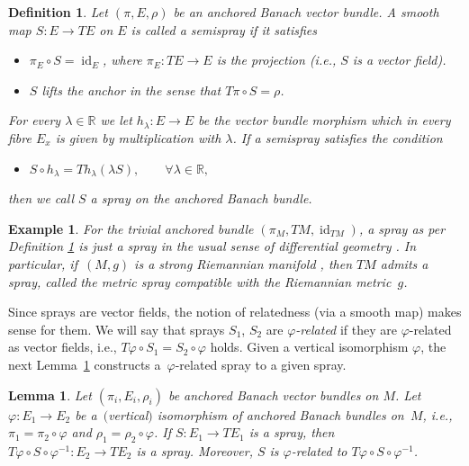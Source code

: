 \documentclass[11pt]{article}
\numberwithin{equation}{section}
\numberwithin{equation}{section}
\newtheorem{Lemma}[Theorem]{Lemma}
\newtheorem{Definition}[Theorem]{Definition}
\newtheorem{Example}[Theorem]{Example}
\newcommand{\R}{\ensuremath{\mathbb{R}}}
\DeclareMathOperator{\id}{id}
\begin{document}
\begin{Definition}\label{defn:spray}
Let $(\pi, E, \rho)$ be an anchored Banach vector bundle.
A smooth map $S\colon E \rightarrow TE$ on $E$ is called a \emph{semispray} if it satisfies
\begin{itemize}\itemsep=0pt
\item[\hypertarget{sprayS1}{(S1)}] $\pi_{E} \circ S = \id_E$, where $\pi_E \colon TE\rightarrow E$ is the projection (i.e., $S$ is a vector field).
\item[\hypertarget{sprayS2}{(S2)}] $S$ \emph{lifts the anchor} in the sense that $T\pi \circ S = \rho$.
\end{itemize}
For every $\lambda \in \R$ we let $h_\lambda \colon E \rightarrow E$ be the vector bundle morphism which in every fibre $E_x$ is given by multiplication with $\lambda$.
If a semispray satisfies the condition
\begin{itemize}\itemsep=0pt
\item[\hypertarget{sprayS3}{(S3)}] $S\circ h_\lambda = Th_\lambda (\lambda S), \qquad \forall \lambda \in \R,$
\end{itemize}
then we call $S$ a \emph{spray} on the anchored Banach bundle.
\end{Definition}

\begin{Example}
For the trivial anchored bundle $(\pi_M, TM,\id_{TM})$, a spray as per Definition \ref{defn:spray} is just a spray in the usual sense of differential geometry \cite[Chapter~IV, Section~3]{La01}.
In particular, if~$(M,g)$ is a strong Riemannian manifold \cite[Section~4]{Sch23}, then $TM$ admits a spray, called the \emph{metric spray} compatible with the Riemannian metric~$g$.
\end{Example}

Since sprays are vector fields, the notion of relatedness (via a smooth map) makes sense for them. We will say that sprays $S_1$, $S_2$ are $\varphi$\emph{-related} if they are $\varphi$-related as vector fields, i.e., $T\varphi \circ S_1 = S_2 \circ \varphi$ holds.
Given a vertical isomorphism $\varphi$, the next Lemma~\ref{lem:anchoredIso} constructs a~$\varphi$-related spray to a given spray.

\begin{Lemma}\label{lem:anchoredIso}
 Let $(\pi_{i},E_{i},\rho_{i})$ be anchored Banach vector bundles on $M$.
 Let $\varphi \colon E_{1} \rightarrow E_{2}$ be a~$($vertical$)$ isomorphism of anchored Banach bundles on~$M$, i.e., $\pi_{1} = \pi_{2}\circ \varphi$ and $\rho_{1} = \rho_{2} \circ \varphi$.
 If $S\colon E_{1} \rightarrow TE_{1}$ is a spray, then $T\varphi \circ S \circ \varphi^{-1}\colon E_{2} \rightarrow TE_{2}$ is a spray.
 Moreover, $S$ is $\varphi$-related to $T \varphi \circ S \circ \varphi^{-1}$.
\end{Lemma}
\end{document}
